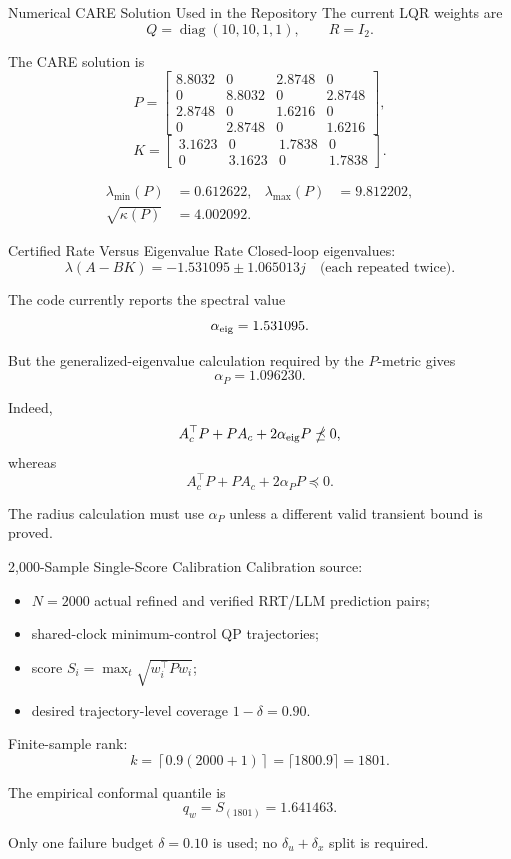 \documentclass[aspectratio=43,11pt]{beamer}
\newcommand{\lmin}{\lambda_{\min}}
\newcommand{\lmax}{\lambda_{\max}}
\begin{document}
\begin{frame}{Numerical CARE Solution Used in the Repository}
The current LQR weights are
\[
Q=\operatorname{diag}(10,10,1,1),
\qquad R=I_2.
\]

The CARE solution is
\[
P=\begin{bmatrix}
8.8032&0&2.8748&0\\
0&8.8032&0&2.8748\\
2.8748&0&1.6216&0\\
0&2.8748&0&1.6216
\end{bmatrix},
\]
\[
K=\begin{bmatrix}
3.1623&0&1.7838&0\\
0&3.1623&0&1.7838
\end{bmatrix}.
\]

\begin{align*}
\lmin(P)&=0.612622, & \lmax(P)&=9.812202,\\
\sqrt{\kappa(P)}&=4.002092.&&
\end{align*}
\end{frame}

\begin{frame}{Certified Rate Versus Eigenvalue Rate}
Closed-loop eigenvalues:
\[
\lambda(A-BK)=-1.531095\pm1.065013j
\quad\text{(each repeated twice).}
\]

The code currently reports the spectral value
\[
\alpha_{\rm eig}=1.531095.
\]

But the generalized-eigenvalue calculation required by the $P$-metric gives
\[
\boxed{\alpha_P=1.096230.}
\]

Indeed,
\[
A_c^\top P+PA_c+2\alpha_{\rm eig}P\npreceq0,
\]
whereas
\[
A_c^\top P+PA_c+2\alpha_PP\preceq0.
\]

The radius calculation must use $\alpha_P$ unless a different valid transient bound is proved.
\end{frame}

\begin{frame}{2,000-Sample Single-Score Calibration}
Calibration source:
\begin{itemize}
  \item $N=2000$ actual refined and verified RRT/LLM prediction pairs;
  \item shared-clock minimum-control QP trajectories;
  \item score $S_i=\max_t\sqrt{w_i^\top Pw_i}$;
  \item desired trajectory-level coverage $1-\delta=0.90$.
\end{itemize}

Finite-sample rank:
\[
k=\left\lceil0.9(2000+1)\right\rceil
=\lceil1800.9\rceil=1801.
\]

The empirical conformal quantile is
\[
\boxed{q_w=S_{(1801)}=1.641463.}
\]

Only one failure budget $\delta=0.10$ is used; no $\delta_u+\delta_x$ split is required.
\end{frame}
\end{document}
